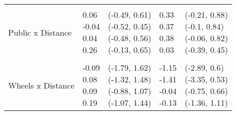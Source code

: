 \documentclass[10pt]{article}
\begin{document}
\begin{table}
\begin{center}
\begin{small}
\begin{tabular}{lllll}
& & & & \\ 
\quad Public x Distance    &  \makecell[l]{\textnormal{0.06\phantom{***}} \\\textnormal{-0.04\phantom{***}} \\\textnormal{0.04\phantom{***}} \\\textnormal{0.26\phantom{***}} \\}   &  \makecell[l]{\textnormal{(-0.49, 0.61)} \\\textnormal{(-0.52, 0.45)} \\\textnormal{(-0.48, 0.56)} \\\textnormal{(-0.13, 0.65)} \\}   &  \makecell[l]{\textnormal{0.33\phantom{***}} \\\textnormal{0.37\phantom{***}} \\\textnormal{0.38\phantom{***}} \\\textnormal{0.03\phantom{***}} \\}   &  \makecell[l]{\textnormal{(-0.21, 0.88)} \\\textnormal{(-0.1, 0.84)} \\\textnormal{(-0.06, 0.82)} \\\textnormal{(-0.39, 0.45)} \\} \\ 
& & & & \\ 
\quad Wheels x Distance    &  \makecell[l]{\textnormal{-0.09\phantom{***}} \\\textnormal{0.08\phantom{***}} \\\textnormal{0.09\phantom{***}} \\\textnormal{0.19\phantom{***}} \\}   &  \makecell[l]{\textnormal{(-1.79, 1.62)} \\\textnormal{(-1.32, 1.48)} \\\textnormal{(-0.88, 1.07)} \\\textnormal{(-1.07, 1.44)} \\}   &  \makecell[l]{\textnormal{-1.15\phantom{***}} \\\textnormal{-1.41\phantom{***}} \\\textnormal{-0.04\phantom{***}} \\\textnormal{-0.13\phantom{***}} \\}   &  \makecell[l]{\textnormal{(-2.89, 0.6)} \\\textnormal{(-3.35, 0.53)} \\\textnormal{(-0.75, 0.66)} \\\textnormal{(-1.36, 1.11)} \\} \\ 

\end{tabular}
\end{small}
\end{center}
\end{table}
\end{document}
